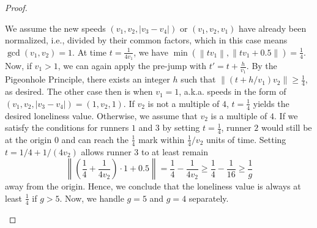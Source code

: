 \documentclass[11pt]{amsart}
\newcommand{\Norm}[1]{\left\lVert #1 \right\rVert}
\begin{document}
\begin{proof}
\begin{itemize}
        \par We assume the new speeds $(v_1, v_2, |v_3 - v_4|)$ or $(v_1, v_2, v_1)$ have already been normalized, i.e., divided by their common factors, which in this case means $\gcd(v_1,v_2) = 1$. At time $t = \frac{1}{4v_1}$, we have $\min(\Norm{tv_1},\Norm{tv_1 + 0.5}) = \frac{1}{4}$. Now, if $v_1 > 1$, we can again apply the pre-jump with $t' = t + \frac{h}{v_1}$. By the Pigeonhole Principle, there exists an integer $h$ such that $\Norm{\left(t + h / v_1\right)v_2} \geq \frac{1}{4}$, as desired. The other case then is when $v_1 = 1$, a.k.a. speeds in the form of $(v_1,v_2,|v_3 - v_4|) = (1,v_2,1)$. If $v_2$ is not a multiple of $4$, $t = \frac{1}{4}$ yields the desired loneliness value. Otherwise, we assume that $v_2$ is a multiple of $4$. If we satisfy the conditions for runners $1$ and $3$ by setting $t = \frac{1}{4}$, runner $2$ would still be at the origin $0$ and can reach the $\frac{1}{4}$ mark within $\frac{1}{4} / v_2$ units of time. Setting $t = 1/4 + 1/(4v_2)$ allows runner $3$ to at least remain 
        $$\Norm{\left(\frac{1}{4} + \frac{1}{4v_2}\right) \cdot 1 + 0.5} = \frac{1}{4} - \frac{1}{4v_2} \geq \frac{1}{4} - \frac{1}{16} \geq \frac{1}{g}$$
        away from the origin. Hence, we conclude that the loneliness value is always at least $\frac{1}{4}$ if $g > 5$. Now, we handle $g = 5$ and $g = 4$ separately.
    \end{itemize}


\end{proof}
\end{document}
